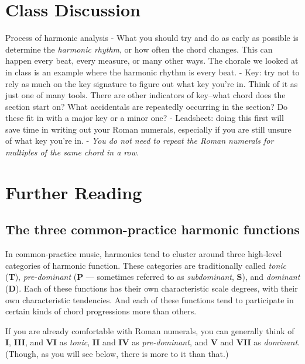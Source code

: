 \documentclass{book}
\begin{document}
\hypertarget{class-discussion-32}{%
\chapter{Class Discussion}\label{class-discussion-32}}

Process of harmonic analysis - What you should try and do as early as possible
is determine the \emph{harmonic rhythm}, or how often the chord changes. This
can happen every beat, every measure, or many other ways. The chorale we
looked at in class is an example where the harmonic rhythm is every beat. -
Key: try not to rely as much on the key signature to figure out what key
you're in. Think of it as just one of many tools. There are other indicators
of key--what chord does the section start on? What accidentals are repeatedly
occurring in the section? Do these fit in with a major key or a minor one? -
Leadsheet: doing this first will save time in writing out your Roman numerals,
especially if you are still unsure of what key you're in. - \emph{You do not
need to repeat the Roman numerals for multiples of the same chord in a row.}

\hypertarget{further-reading-19}{%
\chapter{Further Reading}\label{further-reading-19}}

\hypertarget{the-three-common-practice-harmonic-functions}{%
\section{The three common-practice harmonic
functions}\label{the-three-common-practice-harmonic-functions}}

In common-practice music, harmonies tend to cluster around three high-level
categories of harmonic function. These categories are traditionally called
\emph{tonic} (\textbf{T}), \emph{pre-dominant} (\textbf{P} --- sometimes
referred to as \emph{subdominant}, \textbf{S}), and \emph{dominant}
(\textbf{D}). Each of these functions has their own characteristic scale
degrees, with their own characteristic tendencies. And each of these functions
tend to participate in certain kinds of chord progressions more than others.

If you are already comfortable with Roman numerals, you can generally think of
\textbf{I}, \textbf{III}, and \textbf{VI} as \emph{tonic}, \textbf{II} and
\textbf{IV} as \emph{pre-dominant}, and \textbf{V} and \textbf{VII} as
\emph{dominant}. (Though, as you will see below, there is more to it than
that.)
\end{document}
